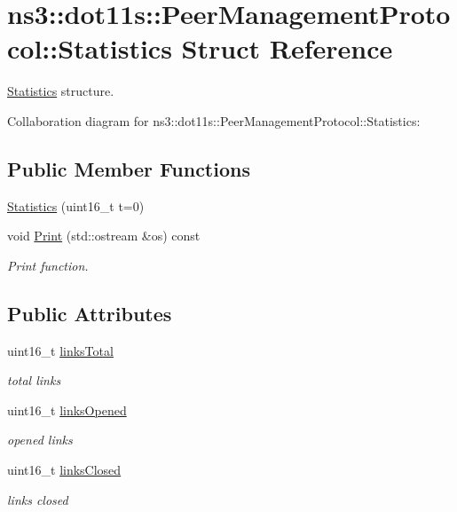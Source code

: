 \hypertarget{structns3_1_1dot11s_1_1PeerManagementProtocol_1_1Statistics}{}\section{ns3\+:\+:dot11s\+:\+:Peer\+Management\+Protocol\+:\+:Statistics Struct Reference}
\label{structns3_1_1dot11s_1_1PeerManagementProtocol_1_1Statistics}


\hyperlink{structns3_1_1dot11s_1_1PeerManagementProtocol_1_1Statistics}{Statistics} structure.  




Collaboration diagram for ns3\+:\+:dot11s\+:\+:Peer\+Management\+Protocol\+:\+:Statistics\+:
\subsection*{Public Member Functions}
\begin{DoxyCompactItemize}
\item 
\hyperlink{structns3_1_1dot11s_1_1PeerManagementProtocol_1_1Statistics_aa3709349fe5dc792ff0b5475b85e924d}{Statistics} (uint16\+\_\+t t=0)
\item 
void \hyperlink{structns3_1_1dot11s_1_1PeerManagementProtocol_1_1Statistics_a0b396d9d23c18d6340f1cf38bab4264a}{Print} (std\+::ostream \&os) const 
\begin{DoxyCompactList}\small\item\em Print function. \end{DoxyCompactList}\end{DoxyCompactItemize}
\subsection*{Public Attributes}
\begin{DoxyCompactItemize}
\item 
uint16\+\_\+t \hyperlink{structns3_1_1dot11s_1_1PeerManagementProtocol_1_1Statistics_a3b84cc20726376c412f76312dc5dd7ee}{links\+Total}
\begin{DoxyCompactList}\small\item\em total links \end{DoxyCompactList}\item 
uint16\+\_\+t \hyperlink{structns3_1_1dot11s_1_1PeerManagementProtocol_1_1Statistics_a54d8ebeb0b661313ce2b1f38e6e09af7}{links\+Opened}
\begin{DoxyCompactList}\small\item\em opened links \end{DoxyCompactList}\item 
uint16\+\_\+t \hyperlink{structns3_1_1dot11s_1_1PeerManagementProtocol_1_1Statistics_a67955b1a6a6244fee5abc172fdec993a}{links\+Closed}
\begin{DoxyCompactList}\small\item\em links closed \end{DoxyCompactList}\end{DoxyCompactItemize}


